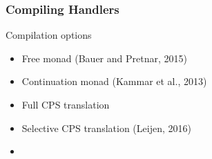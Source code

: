 \documentclass[10pt,compress]{beamer}
\begin{document}
\begin{frame}
  \frametitle{Compiling Handlers}
Compilation options
\begin{itemize}
  \item Free monad (Bauer and Pretnar, 2015)
  \item Continuation monad (Kammar et al., 2013)
  \item Full CPS translation
  \item Selective CPS translation (Leijen, 2016)
  \item {}
\end{itemize}
\end{frame}
\end{document}
